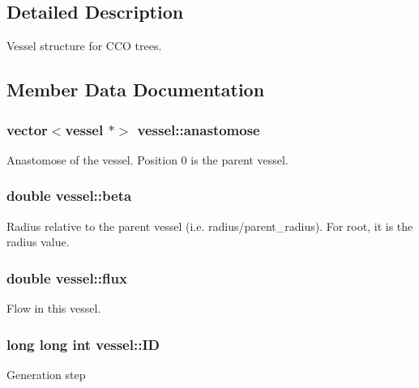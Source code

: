 \subsection{Detailed Description}
Vessel structure for C\+CO trees. 

\subsection{Member Data Documentation}
\subsubsection[{\texorpdfstring{anastomose}{anastomose}}]{\setlength{\rightskip}{0pt plus 5cm}vector$<${\bf vessel} $\ast$$>$ vessel\+::anastomose}\hypertarget{structvessel_a621be11a4aabcc07863d07943060489e}{}\label{structvessel_a621be11a4aabcc07863d07943060489e}
Anastomose of the vessel. Position 0 is the parent vessel. 
\subsubsection[{\texorpdfstring{beta}{beta}}]{\setlength{\rightskip}{0pt plus 5cm}double vessel\+::beta}\hypertarget{structvessel_a46380f25d12bee7300dfa5ad38ba9b38}{}\label{structvessel_a46380f25d12bee7300dfa5ad38ba9b38}
Radius relative to the parent vessel (i.\+e. radius/parent\+\_\+radius). For root, it is the radius value. 
\subsubsection[{\texorpdfstring{flux}{flux}}]{\setlength{\rightskip}{0pt plus 5cm}double vessel\+::flux}\hypertarget{structvessel_a48f09ecdb7e15a0194a76a83c540c55a}{}\label{structvessel_a48f09ecdb7e15a0194a76a83c540c55a}
Flow in this vessel. 
\subsubsection[{\texorpdfstring{ID}{ID}}]{\setlength{\rightskip}{0pt plus 5cm}long long int vessel\+::\+ID}\hypertarget{structvessel_acf4d4ad91fbe09a5a5875b23b940c9ac}{}\label{structvessel_acf4d4ad91fbe09a5a5875b23b940c9ac}
Generation step 
